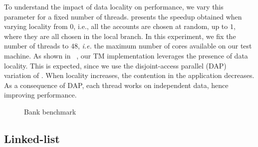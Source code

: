 To understand the impact of data locality on performance, we vary this parameter for a fixed number of threads.
 presents the speedup obtained when varying locality from $0$, i.e., all the accounts are chosen at random, up to $1$, where they are all chosen in the local branch.
In this experiment, we fix the number of threads to $48$, \emph{i.e.} the maximum number of cores available on our test machine.
As shown in ~, our TM implementation leverages the presence of data locality.
This is expected, since we use the disjoint-access parallel (DAP) variation of .
When locality increases, the contention in the application decreases.
As a consequence of DAP, each thread works on independent data, hence improving performance.

\begin{figure}[!t]
  \centering
  \caption{
    Bank benchmark
  }
\end{figure}

\subsection{Linked-list}

